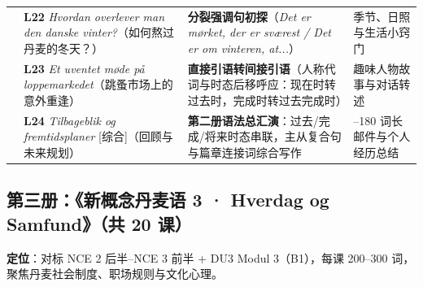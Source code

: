 \documentclass[10.5pt, a4paper]{ctexart}
\begin{document}
{\begin{longtable}{@{} >{\raggedright\arraybackslash}p{2.65cm} >{\raggedright\arraybackslash}p{4.6cm} >{\raggedright\arraybackslash}p{5.15cm} >{\raggedright\arraybackslash}p{3.2cm} @{}}
 & \textbf{L22} \textit{Hvordan overlever man den danske vinter?}\newline （如何熬过丹麦的冬天？） & \textbf{分裂强调句初探}（\textit{Det er mørket, der er sværest / Det er om vinteren, at...}） & 季节、日照与生活小窍门 \\
 & \textbf{L23} \textit{Et uventet møde på loppemarkedet}\newline （跳蚤市场上的意外重逢） & \textbf{直接引语转间接引语}（人称代词与时态后移呼应：现在时转过去时，完成时转过去完成时） & 趣味人物故事与对话转述 \\
 & \textbf{L24} \textit{Tilbageblik og fremtidsplaner} [综合]\newline （回顾与未来规划） & \textbf{第二册语法总汇演}：过去/完成/将来时态串联，主从复合句与篇章连接词综合写作 & 150--180 词长邮件与个人经历总结 \\
\end{longtable}
}

\subsection{第三册：《新概念丹麦语 3 · Hverdag og Samfund》（共 20 课）}
\textbf{定位}：对标 NCE 2 后半--NCE 3 前半 + DU3 Modul 3（B1），每课 200--300 词，聚焦丹麦社会制度、职场规则与文化心理。
\end{document}
